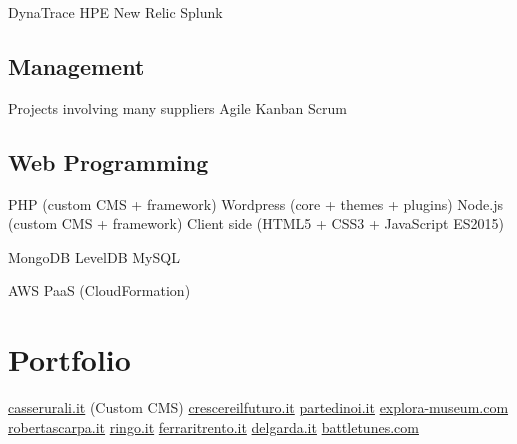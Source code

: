 \documentclass[letterpaper]{deedy-resume} %
\begin{document}
\begin{minipage}[t]{0.33\textwidth}

DynaTrace \textbullet{}
HPE \textbullet{}
New Relic \textbullet{}
Splunk

\sectionspace

\subsection{Management}

Projects involving many suppliers \textbullet{}
Agile \textbullet{}
Kanban \textbullet{} 
Scrum

\sectionspace

\subsection{Web Programming}

%
%
%


PHP (custom CMS + framework) \textbullet{}
Wordpress (core + themes + plugins) \textbullet{}
Node.js  (custom CMS + framework) \textbullet{}
Client side (HTML5 + CSS3 + JavaScript ES2015)

MongoDB \textbullet{}
LevelDB \textbullet{}
MySQL \textbullet{}

AWS \textbullet{}
PaaS (CloudFormation)

\section{Portfolio}

\href{http://www.casserurali.it}{casserurali.it} (Custom CMS) \textbullet{} \href{http://www.crescereilfuturo.it}{crescereilfuturo.it} \textbullet{} 
\href{http://www.partedinoi.it}{partedinoi.it} \textbullet{} 
\href{http://www.explora-museum.com}{explora-museum.com} \textbullet{} 
\href{http://www.robertascarpa.it}{robertascarpa.it} \textbullet{} 
\href{http://www.ringo.it}{ringo.it} \textbullet{} 
\href{http://www.ferraritrento.it}{ferraritrento.it} \textbullet{} 
\href{http://www.delgarda.it}{delgarda.it} \textbullet{} 
\href{http://www.battletunes.com}{battletunes.com}


\end{minipage} %
\end{document}
